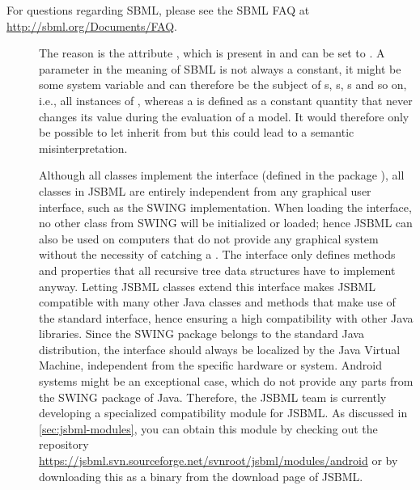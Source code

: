 
For questions regarding SBML, please see the SBML FAQ at
\url{http://sbml.org/Documents/FAQ}.

\begin{description}

\item[\parbox{\textwidth}{Why does the class \LocalParameter not inherit
    from \Parameter?}]

  The reason is the \Boolean attribute , which is present
  in  
  \Parameter and can be set to . A parameter in the meaning of
  SBML is not always a constant, it might be some system variable \Variable
  and can therefore be the subject of s,  \Event{}s,
  \InitialAssignment{}s and so on, i.e., all instances of
  , whereas a \LocalParameter is defined as a constant
  quantity that never changes its value during the evaluation of a
  model. It would therefore only be possible to let \Parameter
  inherit from \LocalParameter but this could lead to a semantic
  misinterpretation.

\item[\parbox{\textwidth}{Does JSBML depend on SWING or any particular
    graphical user interface implementation?}]

  Although all classes implement the \TreeNode interface (defined in
  the package ), all classes in JSBML are entirely
  independent from any graphical user interface, such as the
  SWING
  implementation. When loading the \TreeNode interface, no other
  class from SWING will be initialized or loaded; hence JSBML can also be
  used on computers that do not provide any graphical system without the
  necessity of catching a \HeadlessException. The \TreeNode
  interface only defines methods and properties that all recursive tree data
  structures have to implement anyway. Letting JSBML classes extend this
  interface makes JSBML compatible with many other Java classes and methods
  that make use of the standard \TreeNode interface, hence ensuring a
  high compatibility with other Java libraries. Since the SWING package
  belongs to the standard Java distribution, the
  \TreeNode interface should always be localized by the Java Virtual
  Machine, independent from the specific hardware or
  system. Android systems might be an exceptional case, which
  do not provide any parts from the SWING package of Java. Therefore, the
  JSBML team is currently developing a specialized 
  compatibility module for JSBML. As discussed in \vref{sec:jsbml-modules},
  you can obtain this module by checking out the repository
  \url{https://jsbml.svn.sourceforge.net/svnroot/jsbml/modules/android} or by
  downloading this as a binary from the download page of JSBML.


\end{description}
